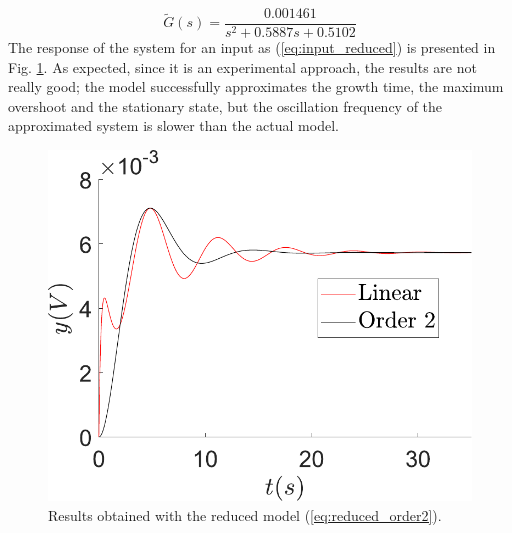\begin{equation}\label{eq:reduced_order2}
    \tilde{G}(s)=\dfrac{0.001461}{s^2 + 0.5887 s + 0.5102}
\end{equation}
The response of the system for an input as (\ref{eq:input_reduced}) is presented in Fig. \ref{fig:reduced_order2}. As expected, since it is an experimental approach, the results are not really good; the model successfully approximates the growth time, the maximum overshoot and the stationary state, but the oscillation frequency of the approximated system is slower than the actual model. 
\begin{figure}[H]
    \centering
    \includegraphics[scale=0.5]{figs/reduc/Red_Aprox_nosotros_orden2.pdf}
    \caption{Results obtained with the reduced model (\ref{eq:reduced_order2}).}
    \label{fig:reduced_order2}
\end{figure}

